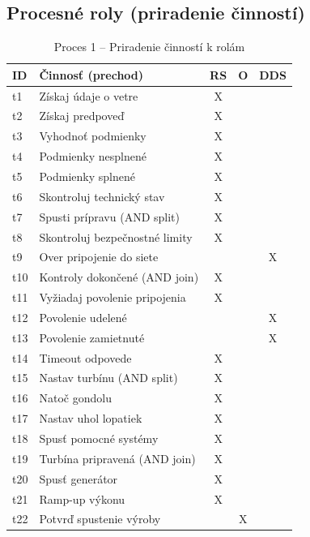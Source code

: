 \documentclass[12pt,a4paper]{article}
\begin{document}
\subsection{Procesné roly (priradenie činností)}
\begin{table}[H]
  \centering
  \small
  \renewcommand{\arraystretch}{1.2}
  \begin{tabularx}{\textwidth}{|l|X|c|c|c|}
    \hline
    \textbf{ID} & \textbf{Činnosť (prechod)} & \textbf{RS} & \textbf{O} & \textbf{DDS} \\
    \hline
    t1 & Získaj údaje o vetre & X & & \\ \hline
    t2 & Získaj predpoveď & X & & \\ \hline
    t3 & Vyhodnoť podmienky & X & & \\ \hline
    t4 & Podmienky nesplnené & X & & \\ \hline
    t5 & Podmienky splnené & X & & \\ \hline
    t6 & Skontroluj technický stav & X & & \\ \hline
    t7 & Spusti prípravu (AND split) & X & & \\ \hline
    t8 & Skontroluj bezpečnostné limity & X & & \\ \hline
    t9 & Over pripojenie do siete & & & X \\ \hline
    t10 & Kontroly dokončené (AND join) & X & & \\ \hline
    t11 & Vyžiadaj povolenie pripojenia & X & & \\ \hline
    t12 & Povolenie udelené & & & X \\ \hline
    t13 & Povolenie zamietnuté & & & X \\ \hline
    t14 & Timeout odpovede & X & & \\ \hline
    t15 & Nastav turbínu (AND split) & X & & \\ \hline
    t16 & Natoč gondolu & X & & \\ \hline
    t17 & Nastav uhol lopatiek & X & & \\ \hline
    t18 & Spusť pomocné systémy & X & & \\ \hline
    t19 & Turbína pripravená (AND join) & X & & \\ \hline
    t20 & Spusť generátor & X & & \\ \hline
    t21 & Ramp-up výkonu & X & & \\ \hline
    t22 & Potvrď spustenie výroby & & X & \\ \hline
  \end{tabularx}
  \caption{Proces 1 -- Priradenie činností k rolám}
\end{table}
\end{document}
